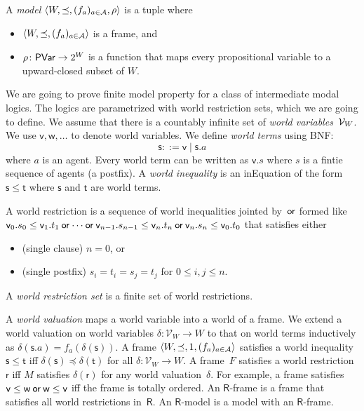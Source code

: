   \begin{definition}
   A \textit{model} $\langle{W,\preceq, (f_a)_{a\in \mathcal A},\rho}\rangle$ is a tuple where
   \begin{itemize}
    \item $\langle{W,\preceq,(f_a)_{a\in \mathcal A}}\rangle$ is a frame, and
    \item $\rho\colon \mathsf{PVar}\rightarrow 2^W$ is a function that maps every
	  propositional variable to a upward-closed subset of $W\!$.
   \end{itemize}
  \end{definition}

  We are going to prove finite model property for a class of
  intermediate modal logics.  The logics are parametrized with
  world restriction sets,  which we are going to define.
  We assume that there is a countably infinite set of \textit{world
  variables}~$\mathcal V_W$.
  We use $\mathsf v, \mathsf w,\ldots$ to denote world variables.
  We define \textit{world terms} using BNF:
  \[
  \mathsf s::=\mathsf v\mid \mathsf s.a
  \]
  where $a$ is an agent.
  Every world term can be written as $\mathsf v.s$ where $s$ is a fintie sequence
  of agents (a postfix).
  A \textit{world inequality} is an inEquation of the form $\mathsf s\le
  \mathsf t$ where $\mathsf s$ and $\mathsf t$ are world terms.
  \begin{definition}
   A world restriction is a sequence of world inequalities jointed
   by~$\mathbin{\mathsf{or}}$ formed like
   $\mathsf v_0.s_0\le\mathsf v_1.t_1\mathbin{\mathsf{or}}\cdots\mathbin{\mathsf{or}}
   \mathsf v_{n-1}.s_{n-1}\le\mathsf v_n.t_n\mathbin{\mathsf{or}} \mathsf v_n.s_n\le\mathsf
   v_0.t_0$ that satisfies either
   \begin{itemize}
    \item (single clause) $n=0$, or
    \item (single postfix) $s_i = t_i = s_j = t_{j}$ for $0\le i,j\le n$.
   \end{itemize}
  \end{definition}
  A \textit{world restriction set} is a finite set of world restrictions.

  A \textit{world valuation} maps a world variable into a world of a frame.
  We extend a world valuation on world variables
  $\delta\colon\mathcal V_W\rightarrow W$ to that on world terms
  inductively as $\delta(\mathsf s.a)=f_a(\delta(\mathsf s))$.
  A frame $\langle{W,\preceq, 1,(f_a)_{a\in\mathcal A}}\rangle$ satisfies a world inequality
  $\mathsf s\le\mathsf t$ iff $\delta(\mathsf s)\preceq \delta(\mathsf t)$
  for all $\delta\colon\mathcal V_W\rightarrow W$.
  A frame~$F$ satisfies a world restriction $\mathsf r$
  iff $M$ satisfies $\delta(\mathsf r)$ for any world valuation~$\delta$.
  For example, a frame satisfies $\mathsf v\le \mathsf w\mathbin{\mathsf{or}}\mathsf
  w\le\mathsf v$ iff the frame is totally ordered.
  An $\mathsf R$-frame is a frame that
  satisfies all world restrictions in~$\mathsf R$.
  An $\mathsf R$-model is a model with an $\mathsf R$-frame.


